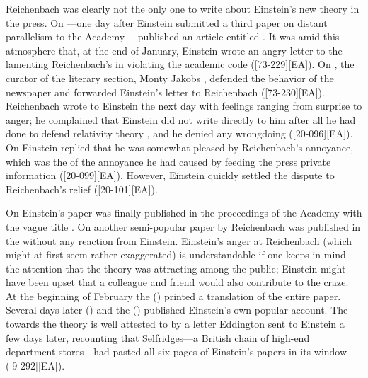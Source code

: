 \documentclass[draft]{article}
\begin{document}
Reichenbach was clearly not the only one to write about Einstein's new theory in the press. On ---one day after Einstein submitted a third paper on distant parallelism \citep{Einstein1929b} to the Academy--- published an article entitled .  It was amid this atmosphere that, at the end of January, Einstein wrote an angry letter to the  lamenting Reichenbach's  in violating the academic code ([73-229][EA]). On , the curator of the literary section, Monty Jakobs \citep[cf.][]{Badenhausen1974}, defended the behavior of the newspaper and forwarded Einstein's letter to Reichenbach ([73-230][EA]). Reichenbach wrote to Einstein the next day with feelings ranging from surprise to anger; he complained that Einstein did not write directly to him after all he had done to defend relativity theory \citep{Hentschel1982}, and he denied any wrongdoing ([20-096][EA]). On  Einstein replied that he was somewhat pleased by Reichenbach's annoyance, which was the  of the annoyance he had caused by feeding the press private information ([20-099][EA]). However, Einstein quickly settled the dispute to Reichenbach's relief ([20-101][EA]). 

On  Einstein's paper was finally published in the proceedings of the Academy with the vague title  \citep{Einstein1929b}. On  another semi-popular paper by Reichenbach was published in the  \citep{Reichenbach1929b} without any reaction from Einstein. Einstein's anger at Reichenbach (which might at first seem rather exaggerated) is understandable if one keeps in mind the attention that the theory was attracting among the public; Einstein might have been upset that a colleague and friend would also contribute to the craze. At the beginning of February the  () printed a translation of the entire paper. Several days later  () and the  () published Einstein's own popular account. The  towards the theory is well attested to by a letter Eddington sent to Einstein a few days later, recounting that Selfridges---a British chain of high-end department stores---had pasted all six pages of Einstein's papers in its window ([9-292][EA]).
\end{document}
